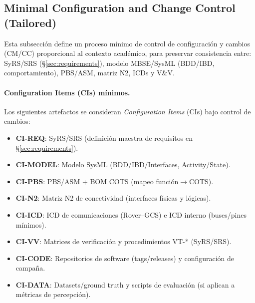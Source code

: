 \subsection{Minimal Configuration and Change Control (Tailored)}\label{subsec:cm-tailored}

Esta subsección define un proceso mínimo de control de configuración y cambios (CM/CC) proporcional al contexto académico, para preservar consistencia entre: SyRS/SRS (\S\ref{sec:requirements}), modelo MBSE/SysML (BDD/IBD, comportamiento), PBS/ASM, matriz N2, ICDs y V\&V.

\paragraph{Configuration Items (CIs) mínimos.}
Los siguientes artefactos se consideran \textit{Configuration Items} (CIs) bajo control de cambios:
\begin{itemize}
  \item \textbf{CI-REQ}: SyRS/SRS (definición maestra de requisitos en \S\ref{sec:requirements}).
  \item \textbf{CI-MODEL}: Modelo SysML (BDD/IBD/Interfaces, Activity/State).
  \item \textbf{CI-PBS}: PBS/ASM + BOM COTS (mapeo función$\rightarrow$COTS).
  \item \textbf{CI-N2}: Matriz N2 de conectividad (interfaces físicas y lógicas).
  \item \textbf{CI-ICD}: ICD de comunicaciones (Rover--GCS) e ICD interno (buses/pines mínimos).
  \item \textbf{CI-VV}: Matrices de verificación y procedimientos VT-* (SyRS/SRS).
  \item \textbf{CI-CODE}: Repositorios de software (tags/releases) y configuración de campaña.
  \item \textbf{CI-DATA}: Datasets/ground truth y scripts de evaluación (si aplican a métricas de percepción).
\end{itemize}

